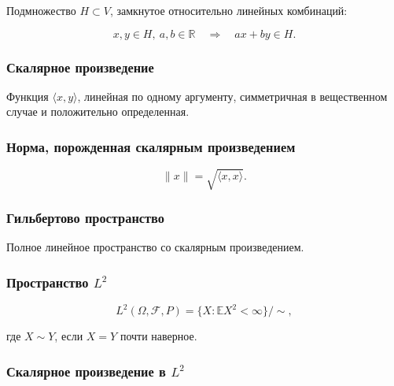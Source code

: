 \documentclass[
  11pt,
  a4paper,
]{article}
\begin{document}
Подмножество \(H\subset V\), замкнутое относительно линейных комбинаций:

\[
x,y\in H,\ a,b\in\mathbb R
\quad\Rightarrow\quad
ax+by\in H.
\]

\subsubsection{Скалярное
произведение}\label{ux441ux43aux430ux43bux44fux440ux43dux43eux435-ux43fux440ux43eux438ux437ux432ux435ux434ux435ux43dux438ux435}

Функция \(\langle x,y\rangle\), линейная по одному аргументу,
симметричная в вещественном случае и положительно определенная.

\subsubsection{Норма, порожденная скалярным
произведением}\label{ux43dux43eux440ux43cux430-ux43fux43eux440ux43eux436ux434ux435ux43dux43dux430ux44f-ux441ux43aux430ux43bux44fux440ux43dux44bux43c-ux43fux440ux43eux438ux437ux432ux435ux434ux435ux43dux438ux435ux43c}

\[
\|x\|=\sqrt{\langle x,x\rangle}.
\]

\subsubsection{Гильбертово
пространство}\label{ux433ux438ux43bux44cux431ux435ux440ux442ux43eux432ux43e-ux43fux440ux43eux441ux442ux440ux430ux43dux441ux442ux432ux43e}

Полное линейное пространство со скалярным произведением.

\subsubsection{\texorpdfstring{Пространство
\(L^2\)}{Пространство L\^{}2}}\label{ux43fux440ux43eux441ux442ux440ux430ux43dux441ux442ux432ux43e-l2-1}

\[
L^2(\Omega,\mathcal F,P)=\{X:\mathbb EX^2<\infty\}/\sim,
\]

где \(X\sim Y\), если \(X=Y\) почти наверное.

\subsubsection{\texorpdfstring{Скалярное произведение в
\(L^2\)}{Скалярное произведение в L\^{}2}}\label{ux441ux43aux430ux43bux44fux440ux43dux43eux435-ux43fux440ux43eux438ux437ux432ux435ux434ux435ux43dux438ux435-ux432-l2}
\end{document}
